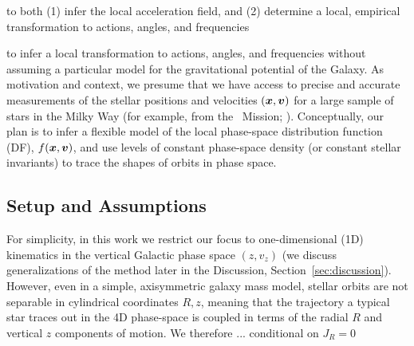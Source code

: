 to both (1) infer the local acceleration field, and (2) determine a local, empirical transformation to actions, angles, and frequencies

to infer a local transformation to actions, angles,
and frequencies without assuming a particular model for the gravitational potential of
the Galaxy.
As motivation and context, we presume that we have access to precise and accurate
measurements of the stellar positions and velocities $(\boldsymbol{x}, \boldsymbol{v})$ for a large
sample of stars in the Milky Way (for example, from the \gaia\ Mission; \citealt{TODO}).
Conceptually, our plan is to infer a flexible model of the local phase-space
distribution function (DF), $f(\boldsymbol{x}, \boldsymbol{v})$, and use levels of constant phase-space
density (or constant stellar invariants) to trace the shapes of orbits in phase space.


\subsection{Setup and Assumptions} \label{sec:methods-setup}

For simplicity, in this work we restrict our focus to one-dimensional (1D) kinematics in
the vertical Galactic phase space $(z, v_z)$ (we discuss generalizations of the method
later in the Discussion, Section~\ref{sec:discussion}). %
However, even in a simple, axisymmetric galaxy mass model, stellar orbits are not
separable in cylindrical coordinates $R, z$, meaning that the trajectory a typical star
traces out in the 4D phase-space is coupled in terms of the radial $R$ and vertical $z$
components of motion.
We therefore ... conditional on $J_R=0$


